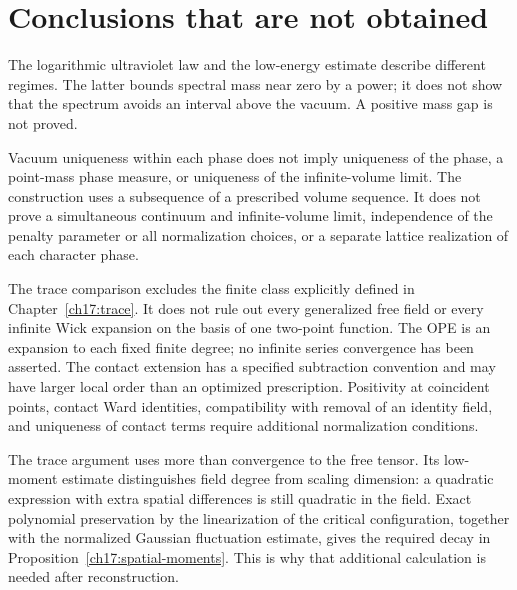 \section{Conclusions that are not obtained}
\label{ch19:scope}

The logarithmic ultraviolet law and the low-energy estimate describe
different regimes. The latter bounds spectral mass near zero by a
power; it does not show that the spectrum avoids an interval above the
vacuum. A positive mass gap is not proved.

Vacuum uniqueness within each phase does not imply uniqueness of the
phase, a point-mass phase measure, or uniqueness of the infinite-volume
limit. The construction uses a subsequence of a prescribed volume
sequence. It does not prove a simultaneous continuum and infinite-volume
limit, independence of the penalty parameter or all normalization choices,
or a separate lattice realization of each character phase.

The trace comparison excludes the finite class explicitly defined in
Chapter~\ref{ch17:trace}. It does not rule out every generalized free
field or every infinite Wick expansion on the basis of one two-point
function. The OPE is an expansion to each fixed finite degree; no
infinite series convergence has been asserted. The contact extension
has a specified subtraction convention and may have larger local order
than an optimized prescription. Positivity at coincident points, contact Ward
identities, compatibility with removal of an identity field, and uniqueness of contact
terms require additional normalization conditions.

The trace argument uses more than convergence to the free tensor. Its
low-moment estimate distinguishes field degree from scaling dimension:
a quadratic expression with extra spatial differences is still quadratic
in the field. Exact polynomial preservation by the linearization of the critical configuration,
together with the normalized Gaussian fluctuation estimate, gives the
required decay in Proposition~\ref{ch17:spatial-moments}. This is why
that additional calculation is needed after reconstruction.
